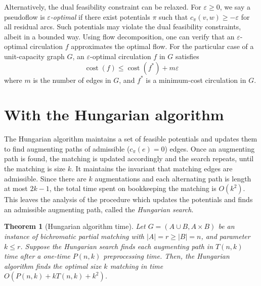 \documentclass[11pt]{article}
\def\eps{\varepsilon}
\theoremstyle{plain}
\newtheorem{theorem}{Theorem}
\def\cost{\operatorname{cost}}
\begin{document}
Alternatively, the dual feasibility constraint can be relaxed.
For $\eps \geq 0$, we say a pseudoflow is \emph{$\eps$-optimal} if there exist 
potentials $\pi$ such that $c_\pi(v, w) \geq -\eps$ for all residual arcs.
Such potentials may violate the dual feasibility constraints, albeit in a 
bounded way.
Using flow decomposition, one can verify that an $\eps$-optimal circulation $f$ 
approximates the optimal flow.
For the particular case of a unit-capacity graph $G$, an $\eps$-optimal 
circulation $f$ in $G$ satisfies
\begin{equation}
\label{equation:eps_opt}
	\cost(f) \leq \cost(f^*) + m\eps
\end{equation}
where $m$ is the number of edges in $G$, and $f^*$ is a minimum-cost 
circulation in $G$.



\section{With the Hungarian algorithm}
\label{section:hung}

The Hungarian algorithm maintains a set of feasible potentials and updates them 
to find augmenting paths of admissible ($c_\pi(e) = 0$) edges.
Once an augmenting path is found, the matching is updated accordingly 
and the search repeats, until the matching is size $k$.
It maintains the invariant that matching edges are admissible.
Since there are $k$ augmentations and each alternating path is length at most 
$2k-1$, the total time spent on bookkeeping the matching is $O(k^2)$.
This leaves the analysis of the procedure which updates the potentials and 
finds an admissible augmenting path, called the \emph{Hungarian search}.


\begin{theorem}[Hungarian algorithm time]
\label{theorem:hung_orig}
	Let $G = (A \cup B, A \times B)$ be an instance of bichromatic partial 
	matching with $|A| = r \geq |B| = n$, and parameter $k \leq r$.
	Suppose the Hungarian search finds each augmenting path in $T(n, k)$ 
	time after a one-time $P(n, k)$ preprocessing time.
	Then, the Hungarian algorithm finds the optimal size $k$ matching in
	time $O(P(n, k) + k T(n, k) + k^2)$.
\end{theorem}
\end{document}
